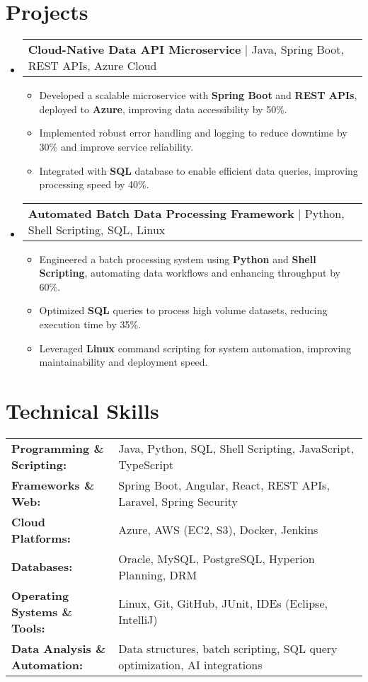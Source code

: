 \documentclass[letterpaper,11pt]{article}
\makeatletter
\newcommand{\resumeItem}[1]{
  \item\footnotesize{
    {#1 \vspace{-2pt}}
  }
}
\newcommand{\resumeProjectHeading}[2]{
    \item
    \begin{tabular*}{1.001\textwidth}{l@{\extracolsep{\fill}}r}
      \small#1 & \textbf{\small #2}\\
    \end{tabular*}\vspace{-7pt}
}
\newcommand{\resumeSubHeadingListStart}{\begin{itemize}[leftmargin=0pt, label={}]}
\newcommand{\resumeSubHeadingListEnd}{\end{itemize}}
\newcommand{\resumeItemListStart}{\begin{itemize}[leftmargin=*]}
\newcommand{\resumeItemListEnd}{\end{itemize}\vspace{-5pt}}
\makeatother
\begin{document}
\section{Projects}
    \vspace{-5pt}
    \resumeSubHeadingListStart
      \resumeProjectHeading
          {\textbf{Cloud-Native Data API Microservice} | Java, Spring Boot, REST APIs, Azure Cloud}{}
          \resumeItemListStart
              \resumeItem{Developed a scalable microservice with \textbf{Spring Boot} and \textbf{REST APIs}, deployed to \textbf{Azure}, improving data accessibility by 50\%.}
              \resumeItem{Implemented robust error handling and logging to reduce downtime by 30\% and improve service reliability.}
              \resumeItem{Integrated with \textbf{SQL} database to enable efficient data queries, improving processing speed by 40\%.}
          \resumeItemListEnd
          \vspace{-16pt}
      \resumeProjectHeading
          {\textbf{Automated Batch Data Processing Framework} | Python, Shell Scripting, SQL, Linux}{}
          \resumeItemListStart
              \resumeItem{Engineered a batch processing system using \textbf{Python} and \textbf{Shell Scripting}, automating data workflows and enhancing throughput by 60\%.}
              \resumeItem{Optimized \textbf{SQL} queries to process high volume datasets, reducing execution time by 35\%.}
              \resumeItem{Leveraged \textbf{Linux} command scripting for system automation, improving maintainability and deployment speed.}
          \resumeItemListEnd
    \resumeSubHeadingListEnd

\vspace{-10pt}
\section{Technical Skills}
        \vspace{-14pt}
        \begin{table}[h]
            \footnotesize
            \begin{tabular}{p{0.3\linewidth} p{0.7\linewidth}}
                \textbf{Programming \& Scripting:} & Java, Python, SQL, Shell Scripting, JavaScript, TypeScript \\
                \textbf{Frameworks \& Web:} & Spring Boot, Angular, React, REST APIs, Laravel, Spring Security \\
                \textbf{Cloud Platforms:} & Azure, AWS (EC2, S3), Docker, Jenkins \\
                \textbf{Databases:} & Oracle, MySQL, PostgreSQL, Hyperion Planning, DRM \\
                \textbf{Operating Systems \& Tools:} & Linux, Git, GitHub, JUnit, IDEs (Eclipse, IntelliJ) \\
                \textbf{Data Analysis \& Automation:} & Data structures, batch scripting, SQL query optimization, AI integrations \\
            \end{tabular}
        \end{table}
\end{document}
